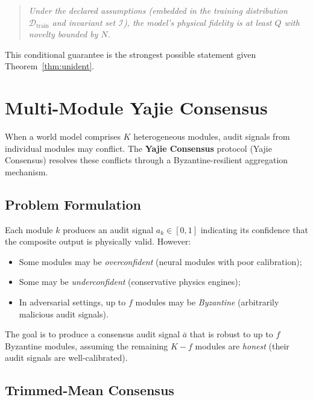 \documentclass[11pt,twocolumn]{article}
\theoremstyle{definition}
\newcommand{\cD}{\mathcal{D}}
\begin{document}
\begin{quote}
  \emph{Under the declared assumptions (embedded in the training distribution
  $\cD_{\text{train}}$ and invariant set $\mathcal{I}$), the model's physical
  fidelity is at least $Q$ with novelty bounded by $N$.}
\end{quote}

This conditional guarantee is the strongest possible statement given
Theorem~\ref{thm:unident}.

\section{Multi-Module Yajie Consensus}
\label{sec:yajie}

When a world model comprises $K$ heterogeneous modules, audit signals from
individual modules may conflict.  The \textbf{Yajie Consensus} protocol
(Yajie Consensus) resolves these conflicts through a Byzantine-resilient
aggregation mechanism.

\subsection{Problem Formulation}

Each module $k$ produces an audit signal $a_k \in [0,1]$ indicating its
confidence that the composite output is physically valid.  However:
\begin{itemize}[nosep]
  \item Some modules may be \emph{overconfident} (neural modules with poor
    calibration);
  \item Some may be \emph{underconfident} (conservative physics engines);
  \item In adversarial settings, up to $f$ modules may be \emph{Byzantine}
    (arbitrarily malicious audit signals).
\end{itemize}

The goal is to produce a consensus audit signal $\bar{a}$ that is robust to
up to $f$ Byzantine modules, assuming the remaining $K - f$ modules are
\emph{honest} (their audit signals are well-calibrated).

\subsection{Trimmed-Mean Consensus}
\end{document}
